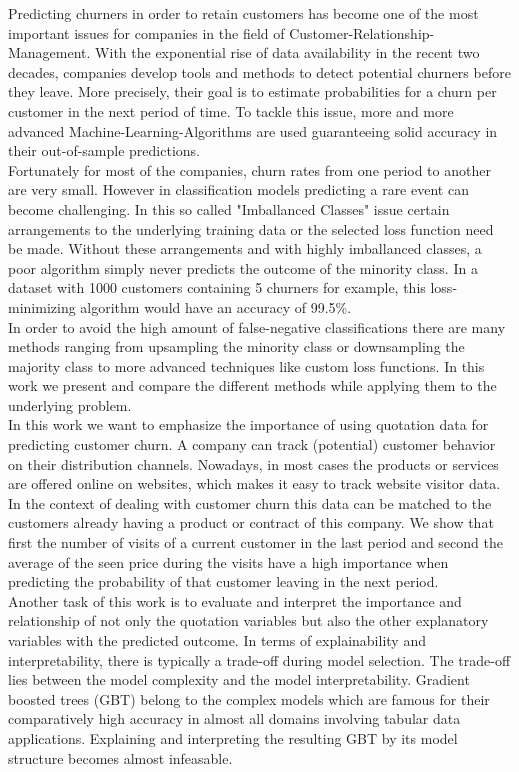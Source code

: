 \documentclass[12pt,titlepage]{article}
\begin{document}
Predicting churners in order to retain customers has become one of the most important issues for companies in the field of Customer-Relationship-Management. With the exponential rise of data availability in the recent two decades, companies develop tools and methods to detect potential churners before they leave. More precisely, their goal is to estimate probabilities for a churn per customer in the next period of time. To tackle this issue, more and more advanced Machine-Learning-Algorithms are used guaranteeing solid accuracy in their out-of-sample predictions. \\
Fortunately for most of the companies, churn rates from one period to another are very small. However in classification
models predicting a rare event can become challenging. In this so called "Imballanced Classes" issue certain arrangements to the underlying training data or the selected loss function need be made. Without these arrangements and with highly imballanced classes, a poor algorithm simply never predicts the outcome of the minority class. In a dataset with 1000 customers containing 5 churners for example, this loss-minimizing algorithm would have an accuracy of 99.5\%. \\
In order to avoid the high amount of false-negative classifications there are many methods ranging from upsampling the
minority class or downsampling the majority class to more advanced techniques like custom loss functions. In this work we present and compare the different methods while applying them to the underlying problem. \\
In this work we want to emphasize the importance of using quotation data for predicting customer churn. A company can
track (potential) customer behavior on their distribution channels. Nowadays, in most cases the products or services are
offered online on websites, which makes it easy to track website visitor data. In the context of dealing with customer
churn this data can be matched to the customers already having a product or contract of this company. We show that first the number of visits of a current customer in the last period and second the average of the seen price during the visits have a high importance when predicting the probability of that customer leaving in the next period. \\
Another task of this work is to evaluate and interpret the importance and relationship of not only the quotation variables but also the other explanatory variables with the predicted outcome. In terms of explainability and interpretability, there is typically a trade-off during model selection. The trade-off lies between the model complexity and the model interpretability. Gradient boosted trees (GBT) belong to the complex models which are famous for their comparatively high accuracy in almost all domains involving tabular data applications. Explaining and interpreting the resulting GBT by its model structure becomes almost infeasable. \\
\end{document}
